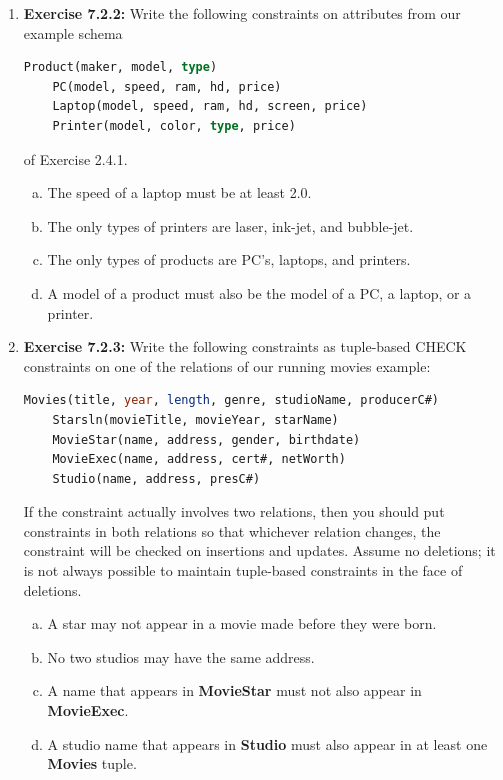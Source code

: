 \documentclass[12pt]{article}
\begin{document}
\begin{enumerate}[1.]
    \item \textbf{Exercise 7.2.2:} Write the following constraints on attributes from our example
    schema

    \begin{lstlisting}[language=SQL]
    Product(maker, model, type)
    PC(model, speed, ram, hd, price)
    Laptop(model, speed, ram, hd, screen, price)
    Printer(model, color, type, price)
    \end{lstlisting}

    \bigskip

    of Exercise 2.4.1.

    \bigskip

    \begin{enumerate}[a)]
        \item The speed of a laptop must be at least 2.0.
        \item The only types of printers are laser, ink-jet, and bubble-jet.
        \item The only types of products are PC’s, laptops, and printers.
        \item A model of a product must also be the model of a PC, a laptop, or a printer.
    \end{enumerate}

    \item \textbf{Exercise 7.2.3:} Write the following constraints as tuple-based CHECK constraints
    on one of the relations of our running movies example:

    \begin{lstlisting}[language=SQL]
    Movies(title, year, length, genre, studioName, producerC#)
    Starsln(movieTitle, movieYear, starName)
    MovieStar(name, address, gender, birthdate)
    MovieExec(name, address, cert#, netWorth)
    Studio(name, address, presC#)
    \end{lstlisting}

    \bigskip

    If the constraint actually involves two relations, then you should put constraints
    in both relations so that whichever relation changes, the constraint will be
    checked on insertions and updates. Assume no deletions; it is not always possible
    to maintain tuple-based constraints in the face of deletions.

    \bigskip

    \begin{enumerate}[a)]
        \item A star may not appear in a movie made before they were born.
        \item No two studios may have the same address.
        \item A name that appears in \textbf{MovieStar} must not also appear in \textbf{MovieExec}.
        \item A studio name that appears in \textbf{Studio} must also appear in at least one \textbf{Movies} tuple.
    \end{enumerate}


\end{enumerate}
\end{document}
